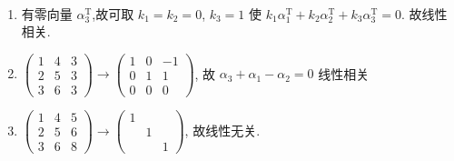 	 \paragraph{} %
		 \begin{enumerate}
			 \item %
			       有零向量 \( \alpha_{3}^{\mathrm{T}} \),故可取 \( k_{1}=k_{2}=0 \), \( k_{3}=1 \) 使 \( k_{1}\alpha_{1}^{\mathrm{T}} + k_{2}\alpha_{2}^{\mathrm{T}} + k_{3}\alpha_{3}^{\mathrm{T}} = 0 \). 故线性相关.
			 \item %
			       \(
			       \begin{pmatrix}
				       1 & 4 & 3 \\
				       2 & 5 & 3 \\
				       3 & 6 & 3\end{pmatrix} \to \begin{pmatrix}
				       1 & 0 & -1 \\
				       0 & 1 & 1  \\
				       0 & 0 & 0
			       \end{pmatrix} \), 故 \( \alpha_{3} + \alpha_{1} - \alpha_{2} = 0 \) 线性相关
			 \item %
			       \(
			       \begin{pmatrix}
				       1 & 4 & 5 \\
				       2 & 5 & 6 \\
				       3 & 6 & 8\end{pmatrix} \to
			       \begin{pmatrix}
				       1 &   &   \\
				         & 1 &   \\
				         &   & 1\end{pmatrix} \), 故线性无关.
		 \end{enumerate}


